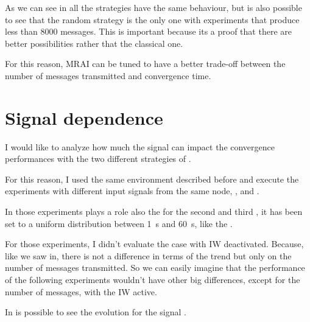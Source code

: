 As we can see in  all the strategies have the same
behaviour, but is also possible to see that the random strategy is the only
one with experiments that produce less than \num{8000} messages.
This is important because its a proof that there are better possibilities rather
that the classical one.

For this reason, \ac{MRAI} can be tuned to have a better trade-off between
the number of messages transmitted and convergence time.

\section{Signal dependence}
\label{sec:bgp_mrai_signal_dependance}

I would like to analyze how much the signal can impact the convergence performances
with the two different strategies of .

For this reason, I used the same environment described before and execute the
experiments with different input signals from the same node, , 
and .

In those experiments plays a role also the 
for the second and third , it has been set to a uniform distribution
between \SI{1}{\second} and \SI{60}{\second}, like the .

For those experiments, I didn't evaluate the case with \ac{IW} deactivated.
Because, like we saw in,
there is not a difference in terms of the trend but only on the number of messages
transmitted.
So we can easily imagine that the performance of the following experiments
wouldn't have other big differences, except for the number of messages, with the
\ac{IW} active.


In  is possible to see the evolution
for the signal .

